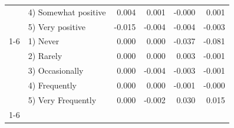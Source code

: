 \begin{longtable}{llrrrr}
 & 4) Somewhat positive & 0.004 & 0.001 & -0.000 & 0.001 \\
 & 5) Very positive & -0.015 & -0.004 & -0.004 & -0.003 \\
\cline{1-6}
\multirow[t]{5}{*}{Toxicity Problem} & 1) Never & 0.000 & 0.000 & -0.037 & -0.081 \\
 & 2) Rarely & 0.000 & 0.000 & 0.003 & -0.001 \\
 & 3) Occasionally & 0.000 & -0.004 & -0.003 & -0.001 \\
 & 4) Frequently & 0.000 & 0.000 & -0.001 & -0.000 \\
 & 5) Very Frequently & 0.000 & -0.002 & 0.030 & 0.015 \\
\cline{1-6}
\end{longtable}
